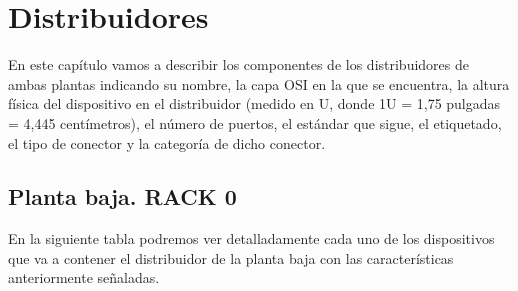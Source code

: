 \chapter{Distribuidores}
En este capítulo vamos a describir los componentes de los distribuidores de ambas plantas indicando su nombre, la capa OSI en la que se encuentra, la altura física del dispositivo en el distribuidor (medido en U, donde 1U = 1,75 pulgadas = 4,445 centímetros), el número de puertos, el estándar que sigue, el etiquetado, el tipo de conector y la categoría de dicho conector.
\section{Planta baja. RACK 0}
En la siguiente tabla podremos ver detalladamente cada uno de los dispositivos que va a contener el distribuidor de la planta baja con las características anteriormente señaladas.
